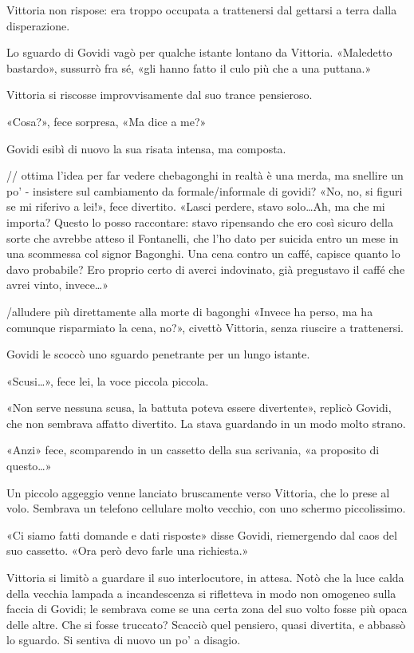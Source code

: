 Vittoria non rispose: era troppo occupata a trattenersi dal gettarsi a terra dalla disperazione.

Lo sguardo di Govidi vagò per qualche istante lontano da Vittoria. «Maledetto bastardo», sussurrò fra sé, «\ldotseppure gli hanno fatto il culo più che a una puttana.»

Vittoria si riscosse improvvisamente dal suo trance pensieroso.

«Cosa?», fece sorpresa, «Ma dice a me?»

Govidi esibì di nuovo la sua risata intensa, ma composta.

// ottima l'idea per far vedere chebagonghi in realtà è una merda, ma snellire un po' - insistere sul cambiamento da formale/informale di govidi?
«No, no, si figuri se mi riferivo a lei!», fece divertito. «Lasci perdere, stavo solo\ldots Ah, ma che mi importa? Questo lo posso raccontare: stavo ripensando che ero così sicuro della sorte che avrebbe atteso il Fontanelli, che l'ho dato per suicida entro un mese in una scommessa col signor Bagonghi. Una cena contro un caffé, capisce quanto lo davo probabile? Ero proprio certo di averci indovinato, già pregustavo il caffé che avrei vinto, invece\ldots»

/alludere più direttamente alla morte di bagonghi
«Invece ha perso, ma ha comunque risparmiato la cena, no?», civettò Vittoria, senza riuscire a trattenersi.

Govidi le scoccò uno sguardo penetrante per un lungo istante.

«Scusi\ldots», fece lei, la voce piccola piccola.

«Non serve nessuna scusa, la battuta poteva essere divertente», replicò Govidi, che non sembrava affatto divertito. La stava guardando in un modo molto strano.

«Anzi» fece, scomparendo in un cassetto della sua scrivania, «a proposito di questo\ldots»

Un piccolo aggeggio venne lanciato bruscamente verso Vittoria, che lo prese al volo. Sembrava un telefono cellulare molto vecchio, con uno schermo piccolissimo.

«Ci siamo fatti domande e dati risposte» disse Govidi, riemergendo dal caos del suo cassetto. «Ora però devo farle una richiesta.»

Vittoria si limitò a guardare il suo interlocutore, in attesa. Notò che la luce calda della vecchia lampada a incandescenza si rifletteva in modo non omogeneo sulla faccia di Govidi; le sembrava come se una certa zona del suo volto fosse più opaca delle altre. Che si fosse truccato? Scacciò quel pensiero, quasi divertita, e abbassò lo sguardo. Si sentiva di nuovo un po' a disagio.

